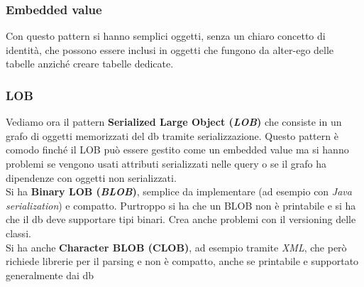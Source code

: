 \documentclass[a4paper,12pt, oneside]{book}
\begin{document}
\subsubsection{Embedded value}
Con questo pattern si hanno semplici oggetti, senza un chiaro concetto di
identità, che possono essere inclusi in oggetti che fungono da alter-ego delle
tabelle anziché creare tabelle dedicate.
\subsubsection{LOB}
Vediamo ora il pattern \textbf{Serialized Large Object (\textit{LOB})} che
consiste in un grafo di oggetti memorizzati del db tramite
serializzazione. Questo pattern è comodo finché il LOB può essere gestito come
un embedded value ma si hanno problemi se vengono usati attributi serializzati
nelle query o se il grafo ha dipendenze con oggetti non serializzati.\\
Si ha \textbf{Binary LOB (\textit{BLOB})}, semplice da implementare (ad esempio
con 
\textit{Java serialization}) e compatto. Purtroppo si ha che un BLOB non è
printabile e si ha che il db deve supportare tipi binari. Crea anche problemi
con il versioning delle classi.\\
Si ha anche \textbf{Character BLOB (CLOB)}, ad esempio tramite \textit{XML}, che
però richiede librerie per il parsing e non è compatto, anche se printabile e
supportato generalmente dai db
\end{document}
